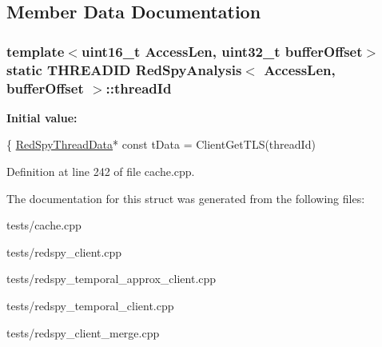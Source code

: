 \subsection{Member Data Documentation}
\hypertarget{structRedSpyAnalysis_a4f659f1fc88dc727b78dc50415aadc07}{
\subsubsection[{thread\-Id}]{\setlength{\rightskip}{0pt plus 5cm}template$<$uint16\-\_\-t Access\-Len, uint32\-\_\-t buffer\-Offset$>$ static T\-H\-R\-E\-A\-D\-I\-D {\bf Red\-Spy\-Analysis}$<$ Access\-Len, buffer\-Offset $>$\-::thread\-Id}}\label{structRedSpyAnalysis_a4f659f1fc88dc727b78dc50415aadc07}
{\bfseries Initial value\-:}
\begin{DoxyCode}
\{
        \hyperlink{structRedSpyThreadData}{RedSpyThreadData}* \textcolor{keyword}{const} tData = ClientGetTLS(threadId)
\end{DoxyCode}


Definition at line 242 of file cache.\-cpp.



The documentation for this struct was generated from the following files\-:\begin{DoxyCompactItemize}
\item 
tests/cache.\-cpp\item 
tests/redspy\-\_\-client.\-cpp\item 
tests/redspy\-\_\-temporal\-\_\-approx\-\_\-client.\-cpp\item 
tests/redspy\-\_\-temporal\-\_\-client.\-cpp\item 
tests/redspy\-\_\-client\-\_\-merge.\-cpp\end{DoxyCompactItemize}
